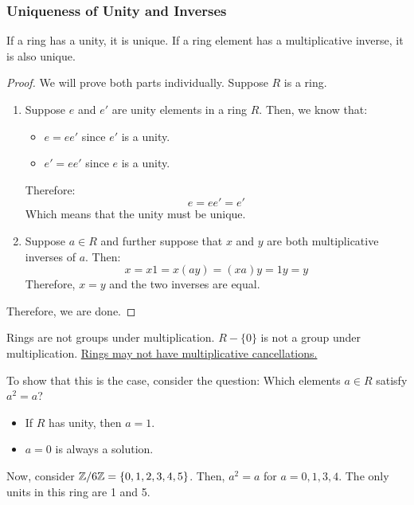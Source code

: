 \documentclass[letterpaper]{article}
\begin{document}
\subsubsection{Uniqueness of Unity and Inverses}
\begin{theorem}{}{}
    If a ring has a unity, it is unique. If a ring element has a multiplicative inverse, it is also unique. 
\end{theorem}

\begin{mdframed}[]
    \begin{proof}
        We will prove both parts individually. Suppose $R$ is a ring.  
        \begin{enumerate}
            \item Suppose $e$ and $e'$ are unity elements in a ring $R$. Then, we know that: 
            \begin{itemize}
                \item $e = ee'$ since $e'$ is a unity. 
                \item $e' = ee'$ since $e$ is a unity. 
            \end{itemize}
            Therefore: 
            \[e = ee' = e'\]
            Which means that the unity must be unique. 

            \item Suppose $a \in R$ and further suppose that $x$ and $y$ are both multiplicative inverses of $a$. Then: 
            \[x = x1 = x(ay) = (xa)y = 1y = y\]
            Therefore, $x = y$ and the two inverses are equal. 
        \end{enumerate}
        Therefore, we are done. 
    \end{proof}
\end{mdframed}

\begin{note}{}{}
    Rings are not groups under multiplication. $R - \{0\}$ is not a group under multiplication. \underline{Rings may not have multiplicative cancellations.}
\end{note}
To show that this is the case, consider the question: Which elements $a \in R$ satisfy $a^2 = a$?
\begin{itemize}
    \item If $R$ has unity, then $a = 1$.
    \item $a = 0$ is always a solution.
\end{itemize}
Now, consider $\mathbb{Z} / 6 \mathbb{Z} = \{0, 1, 2, 3, 4, 5\}$. Then, $a^2 = a$ for $a = 0, 1, 3, 4$. The only units in this ring are 1 and 5. 
\end{document}
